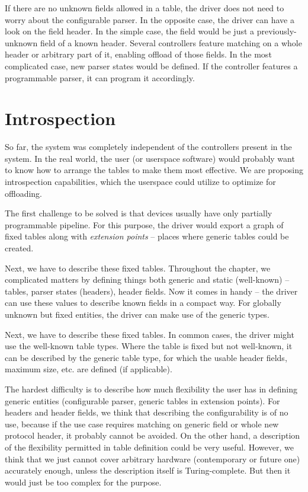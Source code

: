 If there are no unknown fields allowed in a table, the driver does not need to worry
about the configurable parser. In the opposite case, the driver can have a look
on the field header. In the simple case, the field would be just
a previously-unknown field of a known header. Several controllers feature
matching on a whole header or arbitrary part of it, enabling offload of those
fields. In the most complicated case, new parser states would be defined. If
the controller features a programmable parser, it can program it accordingly.

\section{Introspection}

So far, the system was completely independent of the controllers present in the
system. In the real world, the user (or userspace software) would probably want
to know how to arrange the tables to make them most effective. We are proposing
introspection capabilities, which the userspace could utilize to optimize for
offloading.

The first challenge to be solved is that devices usually have only
partially programmable pipeline. For this purpose, the driver would export
a graph of fixed tables along with \emph{extension points} -- places where
generic tables could be created.

Next, we have to describe these fixed tables. Throughout the chapter, we complicated
matters by defining things both generic and static (well-known) -- tables,
parser states (headers), header fields. Now it comes in handy -- the driver can
use these values to describe known fields in a compact way. For globally
unknown but fixed entities, the driver can make use of the generic types.

Next, we have to describe these fixed tables. In common cases, the driver might
use the well-known table types. Where the table is fixed but not well-known, it
can be described by the generic table type, for which the usable header fields,
maximum size, etc. are defined (if applicable).

The hardest difficulty is to describe how much flexibility the user has in
defining generic entities (configurable parser, generic tables in extension
points). For headers and header fields, we think that describing the
configurability is of no use, because if the use case requires matching on
generic field or whole new protocol header, it probably cannot be avoided.
On the other hand, a description of the flexibility permitted in table definition could be very
useful. However, we think that we just cannot cover arbitrary hardware (contemporary
or future one) accurately enough, unless the description itself is
Turing-complete. But then it would just be too complex for the purpose.


